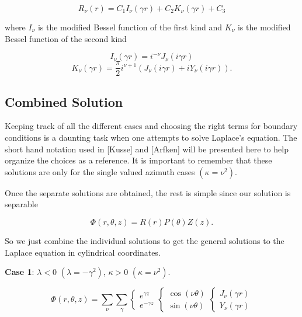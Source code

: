 \documentclass[12pt]{article}
\begin{document}
\begin{equation}
R_{\nu}(r) = C_1 I_{\nu}(\gamma  r) + C_2 K_{\nu}(\gamma  r) + C_3
\end{equation}

where $I_{\nu}$ is the modified Bessel function of the first kind and $K_{\nu}$ is the modified Bessel function of the
second kind

$$I_{\nu}(\gamma r) = i^{-\nu} J_{\nu}(i \gamma r)$$
$$K_{\nu}(\gamma r) = \frac{\pi}{2} i^{\nu+1} \left ( J_{\nu}(i \gamma r) + iY_{\nu}(i \gamma r) \right ) .$$

\subsection{Combined Solution}

Keeping track of all the different cases and choosing the right terms for boundary conditions is a daunting task when one attempts
to solve Laplace's equation.  The short hand notation used in [Kusse] and [Arfken] will be presented here
to help organize the choices as a reference.  It is important to remember that these solutions are only for
the single valued azimuth cases $(\kappa = \nu^2)$.

Once the separate solutions are obtained, the rest is simple since our solution is separable

$$ \Phi \left ( r,\theta,z \right) = R(r)P(\theta)Z(z).$$

So we just combine the individual solutions to get the general solutions to the Laplace equation in cylindrical coordinates.

{\bf Case 1}: $\lambda < 0$ $(\lambda = -\gamma^2)$, $\kappa > 0$ $(\kappa = \nu^2)$.

\begin{equation}
\Phi \left ( r,\theta,z \right) =  \sum_{\nu} \sum_{\gamma} \left \{ \begin{array}{c}
        e^{\gamma z} \\
        e^{-\gamma z}
           \end{array} \right .
     \left \{ \begin{array}{c}
        \cos (\nu \theta) \\
        \sin (\nu \theta)
           \end{array} \right .
        \left \{ \begin{array}{c}
        J_{\nu}(\gamma  r) \\
        Y_{\nu}(\gamma  r)
           \end{array} \right .
\end{equation}
\end{document}
